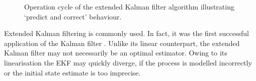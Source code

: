 \begin{figure}[t]
\caption{Operation cycle of the extended Kalman filter algorithm illustrating `predict and correct' behaviour.} \label{fig:extended_kalman_filter_cycle}
\end{figure}

Extended Kalman filtering is commonly used. In fact, it was the first successful application of the Kalman filter \cite{grewal2008kalman}. Unlike its linear counterpart, the extended Kalman filter may not necessarily be an optimal estimator. Owing to its linearisation the EKF may quickly diverge, if the process is modelled incorrectly or the initial state estimate is too imprecise.


